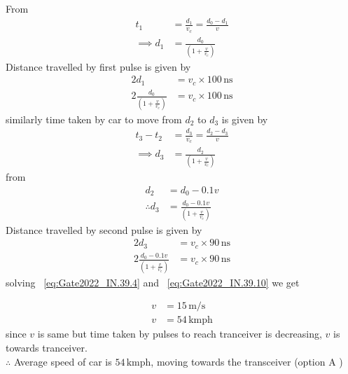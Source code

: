 \documentclass[journal,12pt,onecolumn]{IEEEtran}
\theoremstyle{remark}
\begin{document}
From ~
\begin{align}
    t_1&=\frac{d_1}{v_c}=\frac{d_0-d_1}{v}\\
\implies d_1&=\frac{d_0}{\left(1+\frac{v}{v_c}\right)}
\end{align}
Distance travelled by first pulse is given by 
\begin{align}
    2d_1 &= v_c \times 100 \, \text{ns}\\
    2\frac{d_0}{\left(1+\frac{v}{v_c}\right)}&=v_c \times 100 \, \text{ns}
    \label{eq:Gate2022_IN.39.4}
\end{align}
similarly time taken by car to move from $d_2$ to $d_3$ is given by
\begin{align}
    t_3-t_2&=\frac{d_3}{v_c}=\frac{d_2-d_3}{v}\\
    \implies d_3&=\frac{d_2}{\left(1+\frac{v}{v_c}\right)}
\end{align}
from ~
\begin{align}
    d_2&=d_0-0.1v\\
\therefore d_3&=\frac{d_0-0.1v}{\left(1+\frac{v}{v_c}\right)}
\end{align}
Distance travelled by second pulse is given by 
\begin{align}
    2d_3 &= v_c \times 90 \, \text{ns}\\
    2\frac{d_0-0.1v}{\left(1+\frac{v}{v_c}\right)}&= v_c \times 90 \, \text{ns} \label{eq:Gate2022_IN.39.10}
\end{align}
solving ~\eqref{eq:Gate2022_IN.39.4} and ~\eqref{eq:Gate2022_IN.39.10} we get

\begin{align}
    v &= 15\, \text{m/s} \\
    v &=54\, \text{kmph}
\end{align}
since $v$ is same but time taken by pulses to reach tranceiver is decreasing, $v$ is towards tranceiver.\\
$\therefore$ Average speed of car is $54\,\text{kmph}$, moving towards the transceiver (option A )
\end{document}
